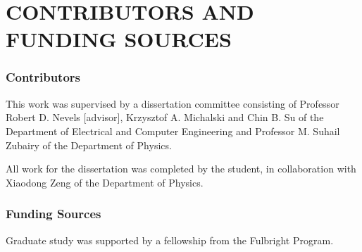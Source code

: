 %
%
%
%


\chapter*{CONTRIBUTORS AND FUNDING SOURCES}


\subsection*{Contributors}

This work was supervised by a dissertation committee consisting of Professor Robert D. Nevels [advisor], Krzysztof A. Michalski and Chin B. Su of the Department of Electrical and Computer Engineering and Professor M. Suhail Zubairy of the Department of Physics.

All work for the dissertation was completed by the student, in collaboration with Xiaodong Zeng of the Department of Physics.

\subsection*{Funding Sources}
%
Graduate study was supported by a fellowship from the Fulbright Program.
\pagebreak{}
